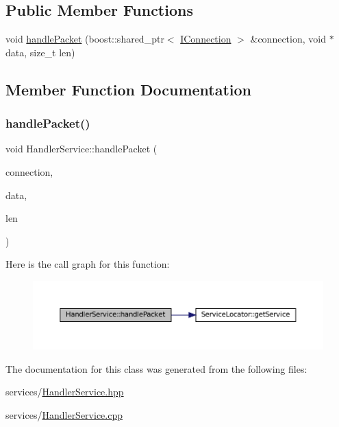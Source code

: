 \subsection*{Public Member Functions}
\begin{DoxyCompactItemize}
\item 
void \mbox{\hyperlink{classHandlerService_a4d688250d26b4300f3de63412308440e}{handle\+Packet}} (boost\+::shared\+\_\+ptr$<$ \mbox{\hyperlink{classIConnection}{I\+Connection}} $>$ \&connection, void $\ast$data, size\+\_\+t len)
\end{DoxyCompactItemize}


\subsection{Member Function Documentation}
\mbox{\label{classHandlerService_a4d688250d26b4300f3de63412308440e}} 
\subsubsection{\texorpdfstring{handle\+Packet()}{handlePacket()}}
{\footnotesize\ttfamily void Handler\+Service\+::handle\+Packet (\begin{DoxyParamCaption}\item[{boost\+::shared\+\_\+ptr$<$ \mbox{\hyperlink{classIConnection}{I\+Connection}} $>$ \&}]{connection,  }\item[{void $\ast$}]{data,  }\item[{size\+\_\+t}]{len }\end{DoxyParamCaption})\hspace{0.3cm}{\ttfamily [inline]}}

Here is the call graph for this function\+:
\nopagebreak
\begin{figure}[H]
\begin{center}
\leavevmode
\includegraphics[width=350pt]{classHandlerService_a4d688250d26b4300f3de63412308440e_cgraph}
\end{center}
\end{figure}


The documentation for this class was generated from the following files\+:\begin{DoxyCompactItemize}
\item 
services/\mbox{\hyperlink{HandlerService_8hpp}{Handler\+Service.\+hpp}}\item 
services/\mbox{\hyperlink{HandlerService_8cpp}{Handler\+Service.\+cpp}}\end{DoxyCompactItemize}
